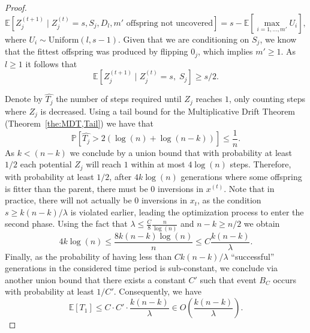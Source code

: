 \begin{proof}
    \begin{displaymath}
    \mathbb{E}[Z^{(t+1)}_j \;|\; Z_j^{(t)}=s, S_j, D_l, \text{$m'$ offspring not uncovered}] = s - \mathbb{E}\left[\max_{i=1,...,m'} U_i\right],
    \end{displaymath}
    where $U_i \sim \text{Uniform}(l, s-1)$. Given that we are conditioning on $S_j$, we know that the fittest offspring was produced by flipping $0_j$, which implies $m' \ge 1$. As $l \ge 1$ it follows that
    \begin{displaymath}
     \mathbb{E}[Z^{(t+1)}_j \;|\; Z_j^{(t)}=s,\; S_j] \ge s/2.
    \end{displaymath}

     Denote by $\hat{T_j}$ the number of steps required until $Z_j$ reaches $1$, only counting steps where $Z_j$ is decreased. Using a tail bound for the Multiplicative Drift Theorem (Theorem~\ref{the:MDT,Tail}) we have that 
    \begin{displaymath}
        \mathbb{P}[\hat{T_j} > 2(\log(n)+\log(n-k))] \le \frac{1}{n}.
    \end{displaymath}
    As $k < (n-k)$ we conclude by a union bound that with probability at least $1/2$ each potential $Z_j$ will reach $1$ within at most $4 \log(n)$ steps. Therefore, with probability at least $1/2$, after $4k\log(n)$ generations where some offspring is fitter than the parent, there must be $0$ inversions in $x^{(t)}$. Note that in practice, there will not actually be $0$ inversions in $x_t$, as the condition $s \ge k(n-k)/\lambda$ is violated earlier, leading the optimization process to enter the second phase. Using the fact that $\lambda \le \frac{C}{8}  \frac{n}{\log(n)}$ and $n-k \ge n/2$ we obtain
    \begin{displaymath}
        4k\log(n) \le \frac{8k(n-k) \log(n)}{n} \le C\frac{k(n-k)}{\lambda}.
    \end{displaymath}
    Finally, as the probability of having less than $C k (n-k) / \lambda$ ``successful'' generations in the considered time period is sub-constant, we conclude via another union bound that there exists a constant $C'$ such that event $B_{C}$ occurs with probability at least $1/C'$. Consequently, we have 
    \begin{displaymath}
        \mathbb{E}[T_1] \le C \cdot C' \cdot \frac{k(n-k)}{\lambda} \in O\left(\frac{k(n-k)}{\lambda}\right).
    \end{displaymath}



\end{proof}
